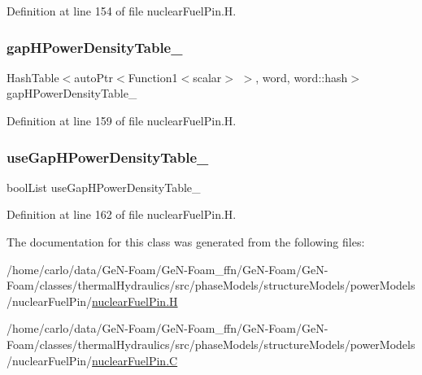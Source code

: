 Definition at line 154 of file nuclear\+Fuel\+Pin.\+H.

\mbox{\label{classFoam_1_1powerModels_1_1nuclearFuelPin_af3e43259f1e5ea73a5bb89f36d6cf584}} 
\subsubsection{\texorpdfstring{gap\+H\+Power\+Density\+Table\+\_\+}{gapHPowerDensityTable\_}}
{\footnotesize\ttfamily Hash\+Table$<$auto\+Ptr$<$Function1$<$scalar$>$ $>$, word, word\+::hash$>$ gap\+H\+Power\+Density\+Table\+\_\+\hspace{0.3cm}{\ttfamily [protected]}}



Definition at line 159 of file nuclear\+Fuel\+Pin.\+H.

\mbox{\label{classFoam_1_1powerModels_1_1nuclearFuelPin_a09a38dead56d361b78f3134ba95438a0}} 
\subsubsection{\texorpdfstring{use\+Gap\+H\+Power\+Density\+Table\+\_\+}{useGapHPowerDensityTable\_}}
{\footnotesize\ttfamily bool\+List use\+Gap\+H\+Power\+Density\+Table\+\_\+\hspace{0.3cm}{\ttfamily [protected]}}



Definition at line 162 of file nuclear\+Fuel\+Pin.\+H.



The documentation for this class was generated from the following files\+:\begin{DoxyCompactItemize}
\item 
/home/carlo/data/\+Ge\+N-\/\+Foam/\+Ge\+N-\/\+Foam\+\_\+ffn/\+Ge\+N-\/\+Foam/\+Ge\+N-\/\+Foam/classes/thermal\+Hydraulics/src/phase\+Models/structure\+Models/power\+Models/nuclear\+Fuel\+Pin/\hyperlink{nuclearFuelPin_8H}{nuclear\+Fuel\+Pin.\+H}\item 
/home/carlo/data/\+Ge\+N-\/\+Foam/\+Ge\+N-\/\+Foam\+\_\+ffn/\+Ge\+N-\/\+Foam/\+Ge\+N-\/\+Foam/classes/thermal\+Hydraulics/src/phase\+Models/structure\+Models/power\+Models/nuclear\+Fuel\+Pin/\hyperlink{nuclearFuelPin_8C}{nuclear\+Fuel\+Pin.\+C}\end{DoxyCompactItemize}
